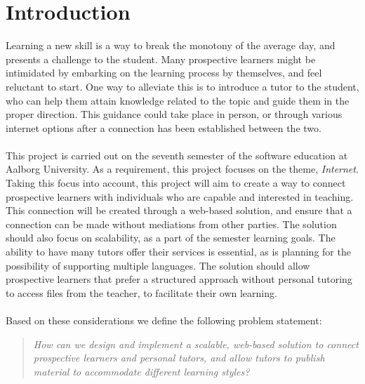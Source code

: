 \chapter{Introduction}\label{chap:introduction}
Learning a new skill is a way to break the monotony of the average day, and presents a challenge to the student.
Many prospective learners might be intimidated by embarking on the learning process by themselves, and feel reluctant to start.
One way to alleviate this is to introduce a tutor to the student, who can help them attain knowledge related to the topic and guide them in the proper direction.
This guidance could take place in person, or through various internet options after a connection has been established between the two.
\\\\
This project is carried out on the seventh semester of the software education at Aalborg University. 
As a requirement, this project focuses on the theme, \textit{Internet}.
Taking this focus into account, this project will aim to create a way to connect prospective learners with individuals who are capable and interested in teaching.
This connection will be created through a web-based solution, and ensure that a connection can be made without mediations from other parties.
The solution should also focus on scalability, as a part of the semester learning goals.
The ability to have many tutors offer their services is essential, as is planning for the possibility of supporting multiple languages.
The solution should allow prospective learners that prefer a structured approach without personal tutoring to access files from the teacher, to facilitate their own learning.
\\\\
Based on these considerations we define the following problem statement:
\begin{quote}
    \textit{How can we design and implement a scalable, web-based solution to connect prospective learners and personal tutors, and allow tutors to publish material to accommodate different learning styles?}
\end{quote}

